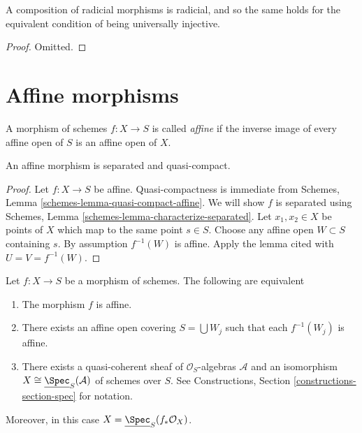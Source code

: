 \begin{lemma}
\label{lemma-composition-universally-injective}
A composition of radicial morphisms is radicial, and so the same holds
for the equivalent condition of being universally injective.
\end{lemma}

\begin{proof}
Omitted.
\end{proof}









\section{Affine morphisms}
\label{section-affine}

\begin{definition}
\label{definition-affine}
A morphism of schemes $f : X \to S$ is called {\it affine} if
the inverse image of every affine open of $S$ is an affine
open of $X$.
\end{definition}

\begin{lemma}
\label{lemma-affine-separated}
An affine morphism is separated and quasi-compact.
\end{lemma}

\begin{proof}
Let $f : X \to S$ be affine. Quasi-compactness is immediate from
Schemes, Lemma \ref{schemes-lemma-quasi-compact-affine}.
We will show $f$ is separated using
Schemes, Lemma \ref{schemes-lemma-characterize-separated}. Let
$x_1, x_2 \in X$ be points of $X$ which map to the same point $s \in S$.
Choose any affine open $W \subset S$ containing $s$. By assumption
$f^{-1}(W)$ is affine. Apply the lemma cited with $U = V = f^{-1}(W)$.
\end{proof}

\begin{lemma}
\label{lemma-characterize-affine}
Let $f : X \to S$ be a morphism of schemes.
The following are equivalent
\begin{enumerate}
\item The morphism $f$ is affine.
\item There exists an affine open covering $S = \bigcup W_j$
such that each $f^{-1}(W_j)$ is affine.
\item There exists a quasi-coherent sheaf of $\mathcal{O}_S$-algebras
$\mathcal{A}$ and an isomorphism
$X \cong \underline{\Spec}_S(\mathcal{A})$
of schemes over $S$. See
Constructions, Section \ref{constructions-section-spec} for notation.
\end{enumerate}
Moreover, in this case $X = \underline{\Spec}_S(f_*\mathcal{O}_X)$.
\end{lemma}

